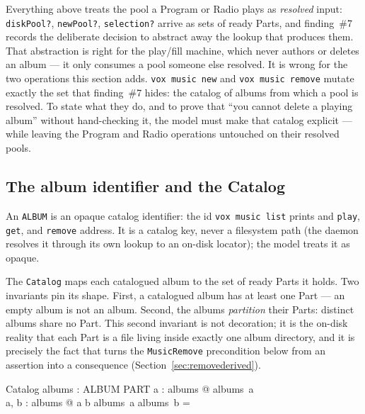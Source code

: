 \documentclass[a4paper,10pt,fleqn]{article}
\begin{document}
Everything above treats the pool a Program or Radio plays as \emph{resolved}
input: \texttt{diskPool?}, \texttt{newPool?}, \texttt{selection?} arrive as
sets of ready Parts, and finding~\#7 records the deliberate decision to abstract
away the lookup that produces them. That abstraction is right for the play/fill
machine, which never authors or deletes an album --- it only consumes a pool
someone else resolved. It is wrong for the two operations this section adds.
\texttt{vox music new} and \texttt{vox music remove} mutate exactly the set that
finding~\#7 hides: the catalog of albums from which a pool is resolved. To state
what they do, and to prove that ``you cannot delete a playing album'' without
hand-checking it, the model must make that catalog explicit --- while leaving
the Program and Radio operations untouched on their resolved pools.

\subsection{The album identifier and the Catalog}

An \texttt{ALBUM} is an opaque catalog identifier: the id \texttt{vox music list}
prints and \texttt{play}, \texttt{get}, and \texttt{remove} address. It is a
catalog key, never a filesystem path (the daemon resolves it through its own
lookup to an on-disk locator); the model treats it as opaque.

\begin{zed}
  [ALBUM]
\end{zed}

The \texttt{Catalog} maps each catalogued album to the set of ready Parts it
holds. Two invariants pin its shape. First, a catalogued album has at least one
Part --- an empty album is not an album. Second, the albums \emph{partition}
their Parts: distinct albums share no Part. This second invariant is not
decoration; it is the on-disk reality that each Part is a file living inside
exactly one album directory, and it is precisely the fact that turns the
\texttt{MusicRemove} precondition below from an assertion into a consequence
(Section~\ref{sec:removederived}).

\begin{schema}{Catalog}
  albums : ALBUM \pfun \power PART
  \where
  \forall a : \dom albums @ albums~a \neq \emptyset \\
  \forall a, b : \dom albums @ a \neq b \implies albums~a \cap albums~b = \emptyset
\end{schema}
\end{document}
